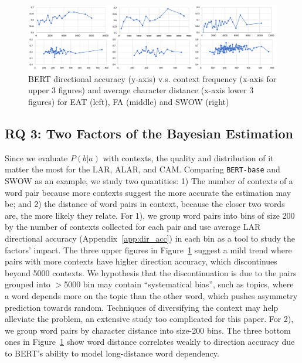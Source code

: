 \documentclass[letterpaper]{article} %
\begin{document}
\begin{figure}%
  \includegraphics[width=\linewidth]{bert_dir_acc_vs_stats.png}
  \caption{BERT directional accuracy (y-axis) v.s. context frequency (x-axis for upper 3 figures) and average character distance (x-axis lower 3 figures) for EAT (left), FA (middle) and SWOW (right)}
  \label{fig:da_stat}
\end{figure}

\subsection{RQ 3: Two Factors of the Bayesian Estimation}
Since we evaluate $P(b|a)$ with contexts, the quality and distribution of it matter the most for the LAR, ALAR, and CAM. Comparing \texttt{BERT-base} and SWOW as an example, we study two quantities: 1) The number of contexts of a word pair because more contexts suggest the more accurate the estimation may be; and 2) the distance of word pairs in context, because the closer two words are, the more likely they relate. For 1), we group word pairs into bins of size 200 by the number of contexts collected for each pair and use average LAR directional accuracy (Appendix~\ref{app:dir_acc}) in each bin as a tool to study the factors' impact. The three upper figures in Figure~\ref{fig:da_stat} suggest a mild trend where pairs with more contexts have higher direction accuracy, which discontinues beyond 5000 contexts. We hypothesis that the discontinuation is due to the pairs grouped into $>$5000 bin may contain ``systematical bias'', such as topics, where a word depends more on the topic than the other word, which pushes asymmetry prediction towards random. Techniques of diversifying the context may help alleviate the problem, an extensive study too complicated for this paper. For 2), we group word pairs by character distance into size-200 bins. The three bottom ones in Figure~\ref{fig:da_stat} show word distance correlates weakly to direction accuracy due to BERT's ability to model long-distance word dependency.
\end{document}
